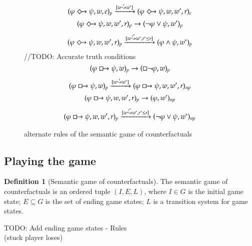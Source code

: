 \documentclass[a4paper,american]{paper}
\theoremstyle{definition}\newtheorem{definition}{Definition}
\begin{document}
\begin{figure}[H]
\begin{equation}
	\end{equation}
	\begin{equation}
		(\varphi\Diamondright\psi ,w,e)_p\xrightarrow{[w\overset{r}{\leadsto}w']}(\varphi\Diamondright\psi ,w,w',r)_{e}
	\end{equation}
	\begin{equation}
		(\varphi\Diamondright\psi ,w,w',r)_p\rightarrow (\neg\varphi\vee\psi ,w')_{p}
	\end{equation}
	\begin{equation}
		(\varphi\Diamondright\psi ,w,w',r)_p\xrightarrow{[w\overset{r^*}{\leadsto}w^*,r^*\leq r]}(\varphi\wedge\psi ,w^*)_{p}
	\end{equation}
	//TODO: Accurate truth conditions
	\begin{equation}
		(\varphi\boxright\psi ,w)_p\rightarrow (\Box\neg\varphi ,w)_{p}
	\end{equation}
	\begin{equation}
		(\varphi\boxright\psi ,w)_p\xrightarrow{[w\overset{r}{\leadsto}w']}(\varphi\boxright\psi ,w,w',r)_{np}
	\end{equation}
	\begin{equation}
		(\varphi\boxright\psi ,w,w',r)_p\rightarrow (\varphi ,w')_{np}
	\end{equation}
	\begin{equation}
		(\varphi\boxright\psi ,w,w',r)_p\xrightarrow{[w\overset{r^*}{\leadsto}w^*,r^*\leq r]}(\neg\varphi\vee\psi ,w^*)_{np}
	\end{equation}
	\caption{alternate rules of the semantic game of counterfactuals}
	\label{fig:rules}
\end{figure}
\subsection{Playing the game}
\begin{definition}[Semantic game of counterfactuals]
The semantic game of counterfactuals is an ordered tuple $(I, E, L)$, where $I\in G$ is the initial game state; $E\subseteq G$ is the set of ending game states; $L$ is a transition system for game states.
\end{definition}

TODO: Add ending game states
- Rules\\ (stuck player loses)
\end{document}
